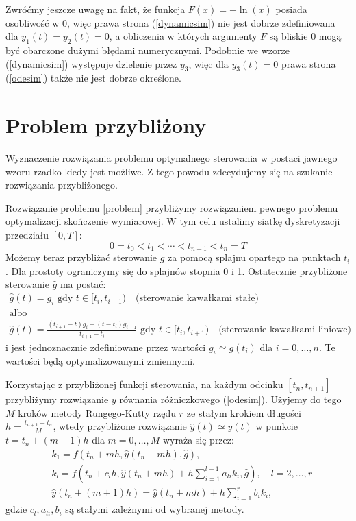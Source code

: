 \documentclass[licencjacka]{pracamgr}
\begin{document}
Zwróćmy jeszcze uwagę na fakt, że funkcja $F(x) = -\ln(x)$ posiada osobliwość w 0, więc prawa strona (\ref{dynamicsim}) nie jest dobrze zdefiniowana dla $y_1(t) = y_2(t) = 0$, a obliczenia w których argumenty $F$ są bliskie 0 mogą być obarczone dużymi błędami numerycznymi. Podobnie we wzorze (\ref{dynamicsim}) występuje dzielenie przez $y_3$, więc dla $y_3(t) = 0$ prawa strona (\ref{odesim}) także nie jest dobrze określone.

\section{Problem przybliżony}\label{simp_problem_subsec}
Wyznaczenie rozwiązania problemu optymalnego sterowania w postaci jawnego wzoru rzadko kiedy jest możliwe. Z tego powodu zdecydujemy się na szukanie rozwiązania przybliżonego.

Rozwiązanie problemu \ref{problem} przybliżymy rozwiązaniem pewnego problemu optymalizacji skończenie wymiarowej. W tym celu ustalimy siatkę dyskretyzacji przedziału $[0, T]$:
\begin{equation}
  0 = t_0 < t_1 < \cdots < t_{n-1} < t_n = T
\end{equation}
Możemy teraz przybliżać sterowanie $g$ za pomocą splajnu opartego na punktach $t_{i}$. Dla prostoty ograniczymy się do splajnów stopnia 0 i 1. Ostatecznie przybliżone sterowanie $\hat{g}$ ma postać:
\begin{gather}  
    \hat{g}(t) = g_i \text{ gdy } t \in [t_{i}, t_{i + 1}) \quad \text{(sterowanie kawałkami stałe)} \label{control_1}\\
    \nonumber \text{albo} \\
    \hat{g}(t) = \frac{(t_{i+1} - t)g_i + (t - t_i)g_{i+1}}{t_{i+1} - t_i} \text{ gdy } t \in [t_i, t_{i+1}) \quad \text{(sterowanie kawałkami liniowe)} \label{control_2}
\end{gather}
i jest jednoznacznie zdefiniowane przez wartości $g_i \simeq g(t_i)$ dla $i = 0,\ldots, n$. Te wartości będą optymalizowanymi zmiennymi.

Korzystając z przybliżonej funkcji sterowania, na każdym odcinku $[t_n, t_{n+1}]$ przybliżymy rozwiązanie $y$ równania różniczkowego (\ref{odesim}). Użyjemy do tego $M$ kroków metody Rungego-Kutty rzędu $r$ ze stałym krokiem długości $h = \frac{t_{n+1} - t_n}{M}$, wtedy przybliżone rozwiązanie $\hat{y}(t) \simeq y(t)$ w punkcie $t = t_n + (m + 1)h$ dla $m = 0,\ldots, M$  wyraża się przez:
\begin{equation} \label{rk}
  \begin{split}
    &k_1 = f(t_n + mh, \hat{y}(t_n + mh), \hat{g}), \\
    &k_l = f(t_n + c_l h, \hat{y}(t_n + mh) + h \sum_{i = 1}^{l-1} a_{li}k_i, \hat{g}),\quad l = 2,\ldots, r \\
    &\hat{y}(t_n + (m+1)h) = \hat{y}(t_n + mh) + h \sum_{i = 1}^r b_i k_i,
  \end{split}
\end{equation}
gdzie $c_l, a_{li}, b_i$ są stałymi zależnymi od wybranej metody.
\end{document}
